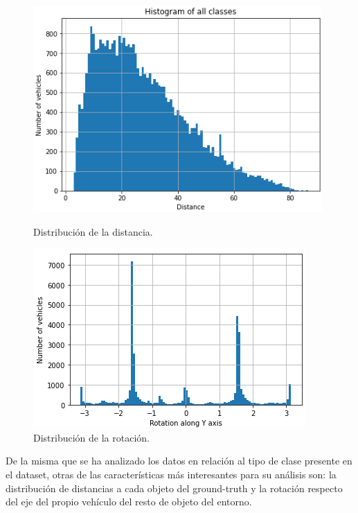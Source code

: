 \begin{figure}[H]
	\begin{minipage}{0.48\textwidth}
		\centering
		\includegraphics[width=0.97\linewidth]{Book/figures/6_approx_distancia/distance_kitti.png}
		\caption{Distribución de la distancia.}
		\label{fig:Distribución de la distancia.}
	\end{minipage}\hfill
	\begin{minipage}{0.45\textwidth}
		\centering
		\includegraphics[width=1\linewidth]{Book/figures/6_approx_distancia/rotation_y_kitti.png}
		\caption{Distribución de la rotación.}
		\label{fig:Distribución de la rotación.}
	\end{minipage}
\end{figure}

De la misma que se ha  analizado los datos en relación al tipo de clase presente en el dataset, otras de las características más interesantes para su análisis son: la distribución de distancias a cada objeto del ground-truth y la rotación respecto del eje del propio vehículo del resto de objeto del entorno.

